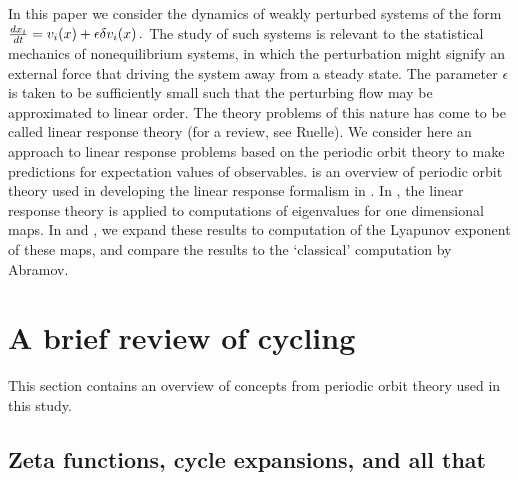 \documentclass[aps,pre,
                showpacs,
                twocolumn,
                groupedaddress,
                superscriptaddress,
                floatfix]{revtex4-1}
\begin{document}
In this paper we consider the dynamics of weakly perturbed systems of
the form
\(
\frac{dx_{i}}{dt}=v_{i}(x) + \epsilon \delta v_{i}(x)
\,.
\) %
The study of such systems is relevant to the statistical mechanics of
nonequilibrium systems, in which the perturbation might signify an
external force that driving the system away from a steady state. The
parameter $\epsilon$ is taken to be sufficiently small such that the
perturbing flow may be approximated to linear order. The
theory problems of this nature has come to be
called linear response theory (for a review, see Ruelle).
We consider here an
approach to linear response problems based on the periodic
orbit theory to make predictions for expectation values of
observables.   is an overview of periodic orbit
theory used in developing the linear response formalism in
. In , the linear response
theory is applied to computations of eigenvalues for one dimensional
maps. In  and , we expand these
results to computation of the Lyapunov exponent of these maps, and
compare the results to the `classical' computation by
Abramov.

\section{A brief review of cycling}
\label{sect:review}

This section contains an overview of concepts from periodic orbit
theory used in this study.

\subsection{Zeta functions, cycle expansions, and all that}
\label{sect:ZetaFcts}
\end{document}
